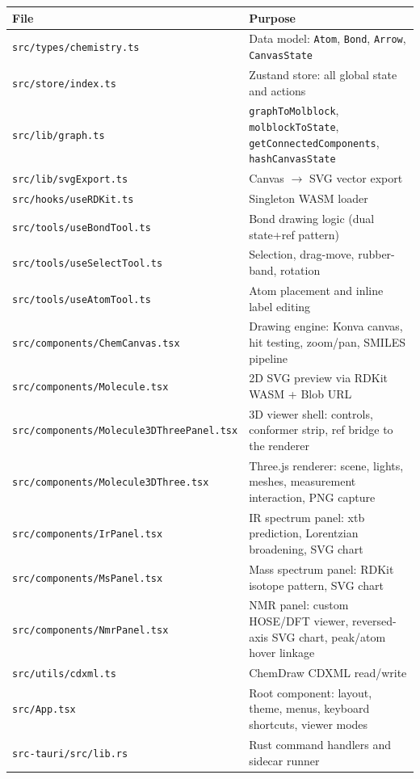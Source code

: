 \documentclass[11pt,a4paper]{article}
\begin{document}
\begin{table}[h!]
\centering
\begin{tabularx}{\textwidth}{@{} l X @{}}
\toprule
\textbf{File} & \textbf{Purpose} \\
\midrule
\texttt{src/types/chemistry.ts} & Data model: \texttt{Atom}, \texttt{Bond}, \texttt{Arrow}, \texttt{CanvasState} \\
\texttt{src/store/index.ts} & Zustand store: all global state and actions \\
\texttt{src/lib/graph.ts} & \texttt{graphToMolblock}, \texttt{molblockToState}, \texttt{getConnectedComponents}, \texttt{hashCanvasState} \\
\texttt{src/lib/svgExport.ts} & Canvas $\to$ SVG vector export \\
\texttt{src/hooks/useRDKit.ts} & Singleton WASM loader \\
\texttt{src/tools/useBondTool.ts} & Bond drawing logic (dual state+ref pattern) \\
\texttt{src/tools/useSelectTool.ts} & Selection, drag-move, rubber-band, rotation \\
\texttt{src/tools/useAtomTool.ts} & Atom placement and inline label editing \\
\texttt{src/components/ChemCanvas.tsx} & Drawing engine: Konva canvas, hit testing, zoom/pan, SMILES pipeline \\
\texttt{src/components/Molecule.tsx} & 2D SVG preview via RDKit WASM + Blob URL \\
\texttt{src/components/Molecule3DThreePanel.tsx} & 3D viewer shell: controls, conformer strip, ref bridge to the renderer \\
\texttt{src/components/Molecule3DThree.tsx} & Three.js renderer: scene, lights, meshes, measurement interaction, PNG capture \\
\texttt{src/components/IrPanel.tsx} & IR spectrum panel: xtb prediction, Lorentzian broadening, SVG chart \\
\texttt{src/components/MsPanel.tsx} & Mass spectrum panel: RDKit isotope pattern, SVG chart \\
\texttt{src/components/NmrPanel.tsx} & NMR panel: custom HOSE/DFT viewer, reversed-axis SVG chart, peak/atom hover linkage \\
\texttt{src/utils/cdxml.ts} & ChemDraw CDXML read/write \\
\texttt{src/App.tsx} & Root component: layout, theme, menus, keyboard shortcuts, viewer modes \\
\texttt{src-tauri/src/lib.rs} & Rust command handlers and sidecar runner \\

\end{tabularx}
\end{table}
\end{document}
